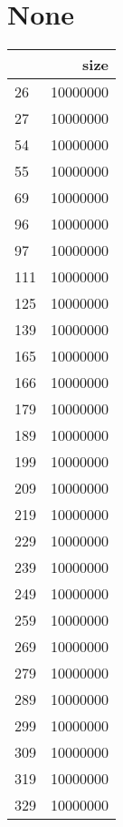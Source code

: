 \documentclass{article}%
\begin{document}
%
\normalsize%
\section{None}%
\label{sec:None}%
\begin{tabular}{lr}
\toprule
{} &      size \\
\midrule
26  &  10000000 \\
27  &  10000000 \\
54  &  10000000 \\
55  &  10000000 \\
69  &  10000000 \\
96  &  10000000 \\
97  &  10000000 \\
111 &  10000000 \\
125 &  10000000 \\
139 &  10000000 \\
165 &  10000000 \\
166 &  10000000 \\
179 &  10000000 \\
189 &  10000000 \\
199 &  10000000 \\
209 &  10000000 \\
219 &  10000000 \\
229 &  10000000 \\
239 &  10000000 \\
249 &  10000000 \\
259 &  10000000 \\
269 &  10000000 \\
279 &  10000000 \\
289 &  10000000 \\
299 &  10000000 \\
309 &  10000000 \\
319 &  10000000 \\
329 &  10000000 \\
\bottomrule
\end{tabular}

%
\end{document}
